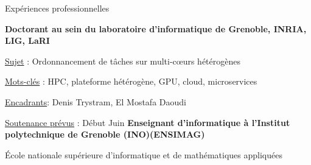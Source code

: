 \begin{rubric}{Expériences professionnelles}



\entry*[2016. - Présent ] 
    \textbf{Doctorant au sein du laboratoire d'informatique de Grenoble, INRIA, LIG, LaRI}
    \hfill {} 
    \par \underline{Sujet} : Ordonnancement de tâches sur multi-cœurs hétérogènes
    \par \underline{Mots-clés} : HPC, plateforme hétérogène, GPU, cloud, microservices 
    \par \underline{Encadrants}: Denis Trystram, El Mostafa Daoudi
    \par \underline{Soutenance prévus} : Début Juin
%
%
    \entry*[$2019 - 2020$] \textbf{Enseignant d'informatique à l'Institut polytechnique de Grenoble (INO)(ENSIMAG)} 
     \hfill{} 
    \par École nationale supérieure d'informatique et de mathématiques appliquées 


\end{rubric}
